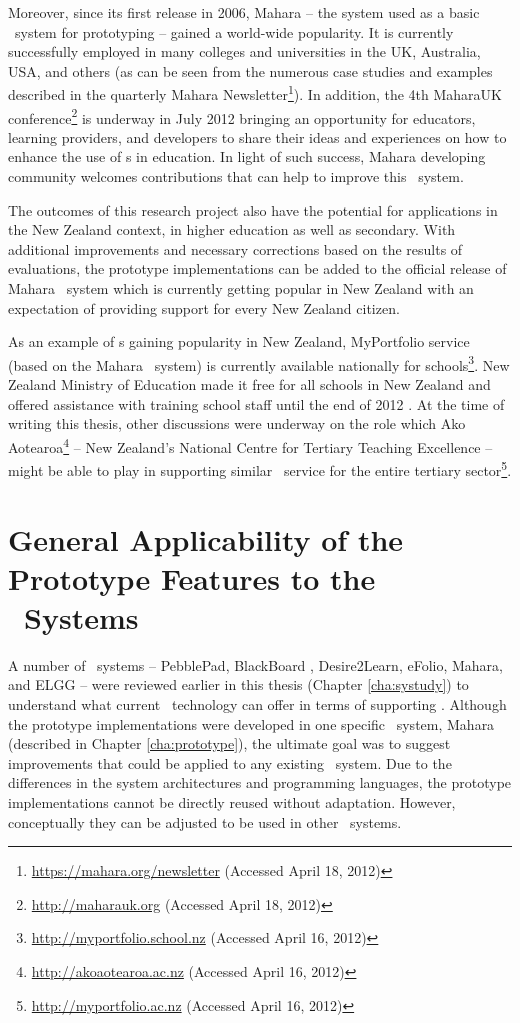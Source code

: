 Moreover, since its first release in 2006, Mahara -- the system used as a basic
\ep~system for prototyping -- gained a world-wide popularity. It is currently
successfully employed in many colleges and universities in the UK, Australia,
USA, and others (as can be seen from the numerous case studies and examples
described in the quarterly Mahara
Newsletter\footnote{\url{https://mahara.org/newsletter} (Accessed April 18,
2012)}). In addition, the 4th MaharaUK
conference\footnote{\url{http://maharauk.org} (Accessed April 18, 2012)} is
underway in July 2012 bringing an opportunity for educators, learning providers,
and developers to share their ideas and experiences on how to enhance the use of
\ep s in education. In light of such success, Mahara developing community
welcomes contributions that can help to improve this \ep~system.

The outcomes of this research project also have the potential for applications
in the New Zealand context, in higher education as well as secondary. With
additional improvements and necessary corrections based on the results of
evaluations, the prototype implementations can be added to the official release
of Mahara \ep~system which is currently getting popular in New Zealand with an
expectation of providing \LLLs support for every New Zealand citizen.

As an example of \ep s gaining popularity in New Zealand, MyPortfolio service
(based on the Mahara \ep~system) is currently available nationally for
schools\footnote{\url{http://myportfolio.school.nz} (Accessed April 16, 2012)}.
New Zealand Ministry of Education made it free for all schools in New Zealand
and offered assistance with training school staff until the end of 2012
\citep{NewZealandMinistryofEducation2012}. At the time of writing this thesis,
other discussions were underway on the role which Ako
Aotearoa\footnote{\url{http://akoaotearoa.ac.nz} (Accessed April 16, 2012)} --
New Zealand's National Centre for Tertiary Teaching Excellence -- might be able
to play in supporting similar \ep~service for the entire tertiary
sector\footnote{\url{http://myportfolio.ac.nz} (Accessed April 16, 2012)}.

\section[General Applicability]{General Applicability of the Prototype
Features to the \ep~Systems}

A number of \ep~systems -- PebblePad, BlackBoard \ep, Desire2Learn, eFolio,
Mahara, and ELGG -- were reviewed earlier in this thesis (Chapter
\ref{cha:systudy}) to understand what current \ep~technology can offer in terms
of supporting \LLLsn. Although the prototype implementations were developed in
one specific \ep~system, Mahara (described in Chapter \ref{cha:prototype}), the
ultimate goal was to suggest improvements that could be applied to any existing
\ep~system. Due to the differences in the system architectures and programming
languages, the prototype implementations cannot be directly reused without
adaptation. However, conceptually they can be adjusted to be used in other
\ep~systems.

